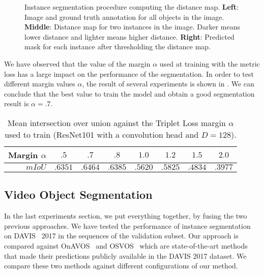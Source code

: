 \begin{figure}[h]
  \centering
  \caption{Instance segmentation procedure computing the distance map.
    \textbf{Left}: Image and ground truth annotation for all objects in the image.
    \textbf{Middle}: Distance map for two instances in the image. Darker means lower distance and lighter means higher distance.
    \textbf{Right}: Predicted mask for each instance after thresholding the distance map.
  }
  \label{fig:experiments:segmentation:distancemaps}
\end{figure}

We have observed that the value of the margin $\alpha$ used at training with the metric loss has a large impact on the performance of the segmentation.
In order to test different margin values $\alpha$, the result of several experiments is shown in .
We can conclude that the best value to train the model and obtain a good segmentation result is $\alpha = .7$.

\begin{table}[h]
  \centering
  \begin{tabular}{r|ccccccc}
    \toprule
    Margin $\alpha$ & $.5$    & $\mathbf{.7}$    & $.8$    & $1.0$   & $1.2$   & $1.5$   & $2.0$   \\
    \midrule
    $mIoU$          & $.6351$ & $\mathbf{.6464}$ & $.6385$ & $.5620$ & $.5825$ & $.4834$ & $.3977$ \\
    \bottomrule
  \end{tabular}
  \caption{Mean intersection over union against the Triplet Loss margin $\alpha$ used to train (ResNet101 with a convolution head and $D=128$). }
  \label{tab:experiments:segmentation:marginmiou}
\end{table}


\subsection{Video Object Segmentation}

In the last experiments section, we put everything together, by fusing the two previous approaches.
We have tested the performance of instance segmentation on DAVIS~\davislast{} 2017 in the sequences of the validation subset.
Our approach is compared against OnAVOS~\onavos{} and OSVOS~\osvos{} which are state-of-the-art methods that made their predictions publicly available in the DAVIS 2017 dataset. We compare these two methods against different configurations of our method.

